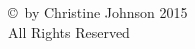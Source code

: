 \newpage

\thispagestyle{empty}
\setcounter{page}{0}

\hspace*{1in}

\vfill
\begin{center}
\copyright \ by Christine Johnson 2015\\
All Rights Reserved
\end{center}

\hspace*{1in}
\vfill
